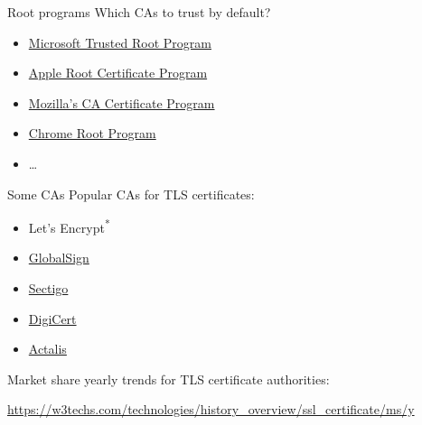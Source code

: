 \begin{frame}{Root programs}
  \pause
  Which CAs to trust by default?
  \begin{itemize}[<+(1)->]
    \item \href{https://aka.ms/RootCert}{Microsoft Trusted Root Program}
    \item \href{https://www.apple.com/certificateauthority/ca_program.html}{Apple Root Certificate Program}
    \item \href{https://wiki.mozilla.org/CA}{Mozilla's CA Certificate Program}
    \item \href{https://g.co/chrome/root-policy}{Chrome Root Program}
    \item \dots
  \end{itemize}
\end{frame}

\begin{frame}{Some CAs}
  Popular CAs for TLS certificates:
  \begin{itemize}[<+(1)->]
    \item Let's Encrypt\textsuperscript{*}
    \item \href{https://www.globalsign.com/en}{GlobalSign}
    \item \href{https://www.sectigo.com}{Sectigo}
    \item \href{https://www.digicert.com}{DigiCert}
    \item \href{https://www.actalis.com}{Actalis}
  \end{itemize}
  
  \vfill

  \pause
  Market share yearly trends for TLS certificate authorities:

  {\scriptsize\url{https://w3techs.com/technologies/history_overview/ssl_certificate/ms/y}}
\end{frame}

